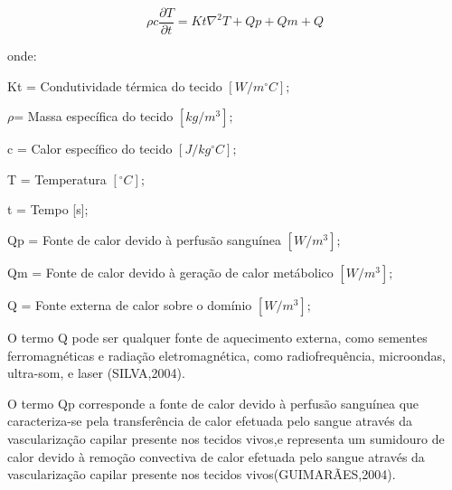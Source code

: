   \begin{equation}\rho c\frac{\partial T}{\partial t} = Kt\nabla^{2}T+ Qp + Qm + Q \end{equation}


  onde:

 Kt = Condutividade térmica do tecido $[W/m^{\circ}C];$

  $\rho $= Massa específica do tecido $[kg/m^3];$

 c = Calor específico do tecido $[J/kg^{\circ}C];$

  T = Temperatura $[^{\circ}C];$

  t = Tempo [s];

   Qp = Fonte de calor devido à perfusão sanguínea $[W/m^3];$


   Qm = Fonte de calor devido à geração de calor metábolico $[W/m^3];$

  Q = Fonte externa de calor sobre o domínio $[W/m^3];$

 O termo Q pode ser qualquer fonte de aquecimento externa, como sementes ferromagnéticas e radiação eletromagnética, como radiofrequência, microondas, ultra-som, e laser (SILVA,2004). %

       O termo Qp corresponde a fonte de calor devido à perfusão sanguínea que caracteriza-se pela transferência de calor efetuada pelo sangue através da vascularização capilar presente nos tecidos vivos,e representa um sumidouro de calor devido à remoção convectiva de calor efetuada pelo sangue através da vascularização capilar presente nos tecidos vivos(GUIMARÃES,2004).%


